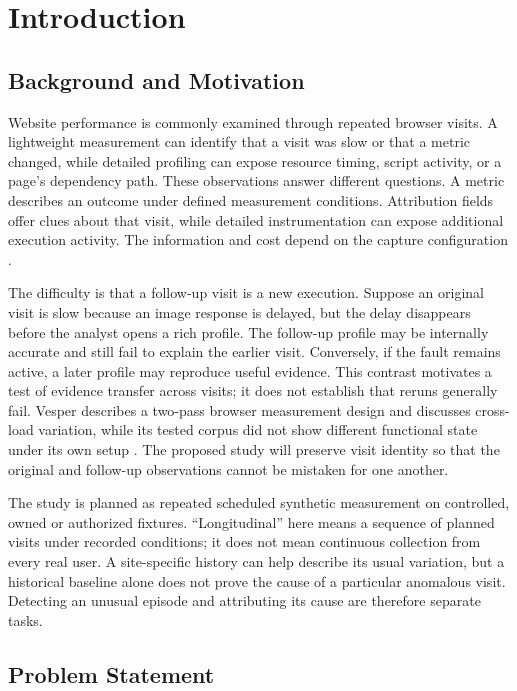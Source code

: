 \chapter{Introduction}
\label{chap:introduction}

\section{Background and Motivation}

Website performance is commonly examined through repeated browser visits. A lightweight measurement can identify that a visit was slow or that a metric changed, while detailed profiling can expose resource timing, script activity, or a page's dependency path. These observations answer different questions. A metric describes an outcome under defined measurement conditions. Attribution fields offer clues about that visit, while detailed instrumentation can expose additional execution activity. The information and cost depend on the capture configuration \parencite{N33VTKAN,HS3PKWFL}.

The difficulty is that a follow-up visit is a new execution. Suppose an original visit is slow because an image response is delayed, but the delay disappears before the analyst opens a rich profile. The follow-up profile may be internally accurate and still fail to explain the earlier visit. Conversely, if the fault remains active, a later profile may reproduce useful evidence. This contrast motivates a test of evidence transfer across visits; it does not establish that reruns generally fail. Vesper describes a two-pass browser measurement design and discusses cross-load variation, while its tested corpus did not show different functional state under its own setup \parencite{HS3PKWFL}. The proposed study will preserve visit identity so that the original and follow-up observations cannot be mistaken for one another.

The study is planned as repeated scheduled synthetic measurement on controlled, owned or authorized fixtures. “Longitudinal” here means a sequence of planned visits under recorded conditions; it does not mean continuous collection from every real user. A site-specific history can help describe its usual variation, but a historical baseline alone does not prove the cause of a particular anomalous visit. Detecting an unusual episode and attributing its cause are therefore separate tasks.

\section{Problem Statement}

